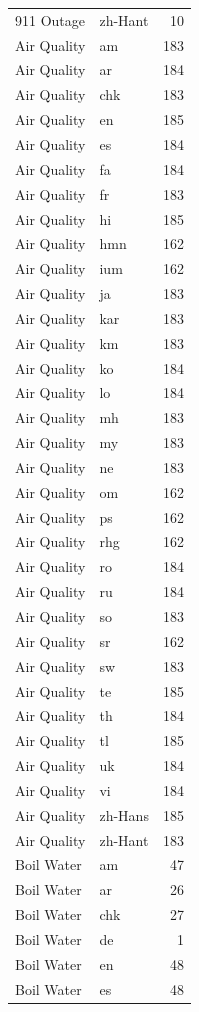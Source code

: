 \begin{longtable}{p{3cm} p{3cm} r}
911 Outage & zh-Hant & 10 \\
Air Quality & am & 183 \\
Air Quality & ar & 184 \\
Air Quality & chk & 183 \\
Air Quality & en & 185 \\
Air Quality & es & 184 \\
Air Quality & fa & 184 \\
Air Quality & fr & 183 \\
Air Quality & hi & 185 \\
Air Quality & hmn & 162 \\
Air Quality & ium & 162 \\
Air Quality & ja & 183 \\
Air Quality & kar & 183 \\
Air Quality & km & 183 \\
Air Quality & ko & 184 \\
Air Quality & lo & 184 \\
Air Quality & mh & 183 \\
Air Quality & my & 183 \\
Air Quality & ne & 183 \\
Air Quality & om & 162 \\
Air Quality & ps & 162 \\
Air Quality & rhg & 162 \\
Air Quality & ro & 184 \\
Air Quality & ru & 184 \\
Air Quality & so & 183 \\
Air Quality & sr & 162 \\
Air Quality & sw & 183 \\
Air Quality & te & 185 \\
Air Quality & th & 184 \\
Air Quality & tl & 185 \\
Air Quality & uk & 184 \\
Air Quality & vi & 184 \\
Air Quality & zh-Hans & 185 \\
Air Quality & zh-Hant & 183 \\
Boil Water & am & 47 \\
Boil Water & ar & 26 \\
Boil Water & chk & 27 \\
Boil Water & de & 1 \\
Boil Water & en & 48 \\
Boil Water & es & 48 \\

\end{longtable}
